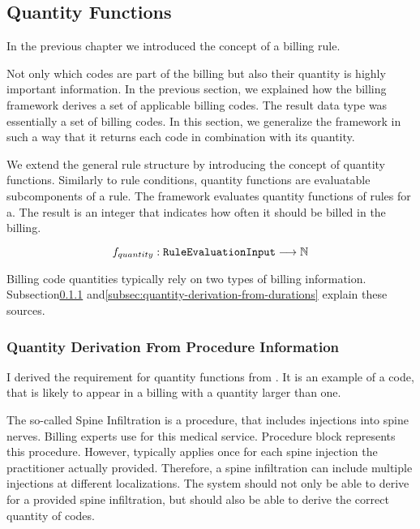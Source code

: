 \subsection{Quantity Functions}\label{subsec:quantity-functions}

In the previous chapter we introduced the concept of a billing rule.

Not only which codes are part of the billing but also their quantity is highly important information.
In the previous section, we explained how the billing framework derives a set of applicable billing codes.
The result data type was essentially a set of billing codes.
In this section, we generalize the framework in such a way that it returns each code in combination with its quantity.

We extend the general rule structure by introducing the concept of quantity functions.
Similarly to rule conditions, quantity functions are evaluatable subcomponents of a rule.
The framework evaluates quantity functions of rules for a.
The result is an integer that indicates how often it should be billed in the billing.

\begin{equation}
    \label{eq:quantity-function-natural}
    f_{quantity}: \texttt{RuleEvaluationInput} \longrightarrow \mathbb{N}
\end{equation}

Billing code quantities typically rely on two types of billing information.
Subsection\ref{subsubsec:quantity-derivation-from-procedure-information} and\ref{subsec:quantity-derivation-from-durations} explain these sources.

\subsubsection{Quantity Derivation From Procedure Information}\label{subsubsec:quantity-derivation-from-procedure-information}

I derived the requirement for quantity functions from .
It is an example of a code, that is likely to appear in a billing with a quantity larger than one.

The so-called Spine Infiltration is a procedure, that includes injections into spine nerves.
Billing experts use  for this medical service.
Procedure block  represents this procedure.
However,  typically applies once for each spine injection the practitioner actually provided.
Therefore, a spine infiltration can include multiple injections at different localizations.
The system should not only be able to derive  for a provided spine infiltration, but should also be able to derive the correct quantity of  codes.

